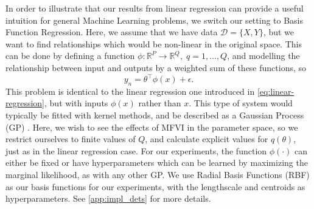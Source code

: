 \documentclass{article}
\theoremstyle{plain}
\theoremstyle{definition}
\theoremstyle{remark}
\theoremstyle{plain}
\newcommand{\R}{\mathbb{R}}
\newcommand{\data}{\mathcal{D}}
\begin{document}

In order to illustrate that our results from linear regression can provide a useful intuition for general Machine Learning problems, we switch our setting to Basis Function Regression. Here, we assume that we have data $\data = \{X, Y\}$, but we want to find relationships which would be non-linear in the original space. This can be done by defining a function $\phi: \R^P \to \R^Q, \; q =1, \dots, Q $, and modelling the relationship between input and outputs by a weighted sum of these functions, so 
\begin{equation}
    y_n = \theta^\top \phi(x) + \epsilon. 
\end{equation}
This problem is identical to the linear regression one introduced in \cref{eq:linear-regression}, but with inputs $\phi(x)$ rather than $x$. This type of system would typically be fitted with kernel methods, and be described as a Gaussian Process (GP) \cite{10.7551/mitpress/3206.001.0001}. Here, we wish to see the effects of MFVI in the parameter space, so we restrict ourselves to finite values of $Q$, and calculate explicit values for $q(\theta)$, just as in the linear regression case. For our experiments, the function $\phi(\cdot)$ can either be fixed or have hyperparameters which can be learned by maximizing the marginal likelihood, as with any other GP. We use Radial Basis Functions (RBF) as our basis functions for our experiments, with the lengthscale and centroids as hyperparameters. See \cref{app:impl_dets} for more details.
\end{document}
